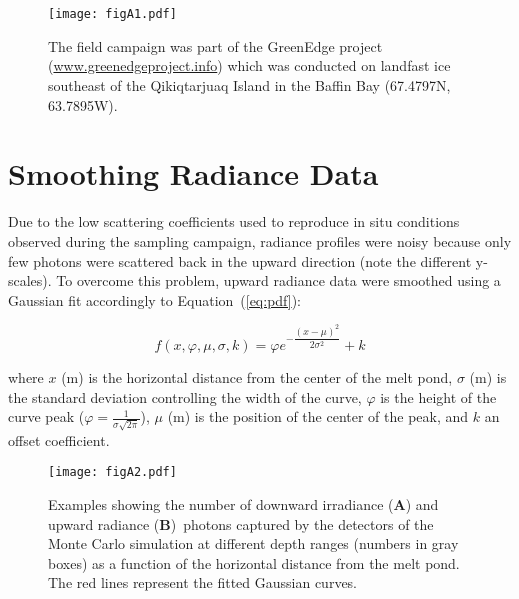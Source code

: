 \documentclass[applsci,article,accept,moreauthors,pdftex,10pt,a4paper]{Definitions/mdpi}
\begin{document}
\section{}\label{app}

\begin{figure}[H]
	\centering
	\texttt{[image: figA1.pdf]}
	\caption{The field campaign was part of the GreenEdge project (\url{www.greenedgeproject.info}) which was conducted on landfast ice southeast of the Qikiqtarjuaq Island in the Baffin Bay (67.4797N, 63.7895W).}\label{figA1}
\end{figure}



\section{Smoothing Radiance Data}

Due to the low %
scattering coefficients used to reproduce in situ conditions observed during the sampling campaign, radiance profiles were noisy because only few photons were scattered back in the upward direction (note the different y-scales). To overcome this problem, upward radiance data were smoothed using a Gaussian fit accordingly to Equation~(\ref{eq:pdf}): 

\begin{equation}
	\label{eq:pdf}
	f(x,\varphi,\mu,\sigma, k) = \varphi e^{-\dfrac{(x-\mu)^2}{2 \sigma^2}} + k
\end{equation}

\noindent where $x$ (m) is the horizontal distance from the center of the melt pond, $\sigma$ (m) is the standard deviation controlling the width of the curve, $\varphi$ is the height of the curve peak ($\varphi = \frac{1}{\sigma\sqrt{2\pi}}$), $\mu$ (m) is the position of the center of the peak, and $k$ an offset coefficient.

\begin{figure}[H]
	\centering
	\texttt{[image: figA2.pdf]}
	\caption{Examples showing the number of downward irradiance (\textbf{A}) and upward radiance (\textbf{B})~photons captured by the detectors of the Monte Carlo simulation at different depth ranges (numbers in gray boxes) as a function of the horizontal distance from the melt pond. The red lines represent the fitted Gaussian curves.}\label{figA2}
\end{figure}
\end{document}

